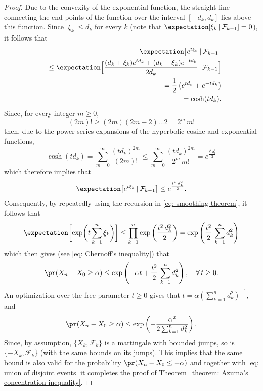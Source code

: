 \documentclass{article}
\theoremstyle{plain}
\begin{document}
\begin{proof}
Due to the convexity of the exponential function, the straight line connecting
the end points of the function over the interval $[-d_k, d_k]$ lies
above this function. Since $|\xi_k| \leq d_k$ for every $k$
(note that $\expectation[\xi_k \, | \, \mathcal{F}_{k-1}] = 0$), it follows that
\begin{eqnarray}
&& \expectation \bigl[e^{t \xi_k} \, | \, \mathcal{F}_{k-1}\bigr] \nonumber \\
&& \leq \expectation \Bigl[\frac{(d_k + \xi_k) e^{t d_k} + (d_k-\xi_k) e^{-t d_k}}{2 d_k}
\, | \, \mathcal{F}_{k-1} \Bigr] \nonumber \\
&& = \frac{1}{2} \, \bigl(e^{t d_k} + e^{-t d_k} \bigr) \nonumber \\
&& = \cosh(t d_k).
\label{eq: cosine hyperbolic}
\end{eqnarray}
Since, for every integer $m \geq 0$,
$$(2m)! \geq (2m) (2m-2) \ldots 2 = 2^m \, m!$$
then, due to the power series expansions of the hyperbolic cosine and exponential functions,
$$\cosh(t d_k) = \sum_{m=0}^{\infty} \frac{(t d_k)^{2m}}{(2m)!}
\leq \sum_{m=0}^{\infty} \frac{(t d_k)^{2m}}{2^m \, m!} = e^{\frac{t^2 \, d_k^2}{2}}$$
which therefore implies that
$$ \expectation \bigl[e^{t \xi_k} \, | \, \mathcal{F}_{k-1}\bigr] \leq e^{\frac{t^2 \, d_k^2}{2}}.$$
Consequently, by repeatedly using the recursion in \eqref{eq: smoothing theorem}, it follows
that
\begin{equation*}
\expectation \biggl[ \exp \biggl(t \sum_{k=1}^n \xi_k \biggr)
\biggr] \leq \prod_{k=1}^n \exp\left(\frac{t^2 \, d_k^2}{2}\right)
= \exp \left(\frac{t^2}{2} \, \sum_{k=1}^n d_k^2 \right)
\end{equation*}
which then gives (see \eqref{eq: Chernoff's inequality}) that
\begin{equation*}
\pr(X_n - X_0 \geq \alpha) \leq
\exp\left(-\alpha t + \frac{t^2}{2} \, \sum_{k=1}^n d_k^2 \right), \quad \forall \, t \geq 0.
\end{equation*}
An optimization over the free parameter $t \geq 0$ gives that
$t = \alpha \left(\sum_{k=1}^n d_k^2\right)^{-1}$, and
\begin{equation}
\pr(X_n - X_0 \geq \alpha) \leq \exp \left(-\frac{\alpha^2}{2 \sum_{k=1}^n d_k^2} \right).
\label{eq: one-sided Azuma's inequality}
\end{equation}
Since, by assumption, $\{X_k, \mathcal{F}_k \}$ is a martingale with bounded jumps,
so is $\{-X_k, \mathcal{F}_{k}\}$ (with the same bounds on its jumps). This implies
that the same bound is also valid for the probability $\pr(X_n - X_0 \leq -\alpha)$
and together with \eqref{eq: union of disjoint events} it completes the proof of
Theorem~\ref{theorem: Azuma's concentration inequality}.
\end{proof}
\end{document}
